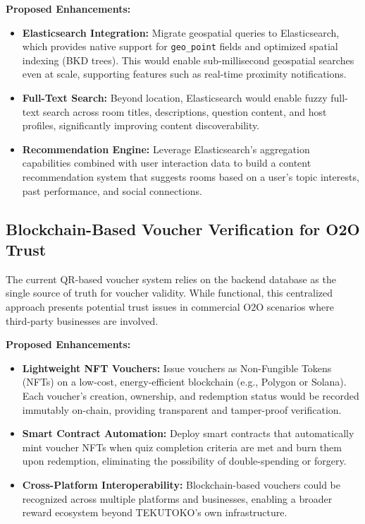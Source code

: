 \textbf{Proposed Enhancements:}
\begin{itemize}
    \item \textbf{Elasticsearch Integration:} Migrate geospatial queries to Elasticsearch, which provides native support for \texttt{geo\_point} fields and optimized spatial indexing (BKD trees). This would enable sub-millisecond geospatial searches even at scale, supporting features such as real-time proximity notifications.
    
    \item \textbf{Full-Text Search:} Beyond location, Elasticsearch would enable fuzzy full-text search across room titles, descriptions, question content, and host profiles, significantly improving content discoverability.
    
    \item \textbf{Recommendation Engine:} Leverage Elasticsearch's aggregation capabilities combined with user interaction data to build a content recommendation system that suggests rooms based on a user's topic interests, past performance, and social connections.
\end{itemize}

\subsection{Blockchain-Based Voucher Verification for O2O Trust}

The current QR-based voucher system relies on the backend database as the single source of truth for voucher validity. While functional, this centralized approach presents potential trust issues in commercial O2O scenarios where third-party businesses are involved.

\textbf{Proposed Enhancements:}
\begin{itemize}
    \item \textbf{Lightweight NFT Vouchers:} Issue vouchers as Non-Fungible Tokens (NFTs) on a low-cost, energy-efficient blockchain (e.g., Polygon or Solana). Each voucher's creation, ownership, and redemption status would be recorded immutably on-chain, providing transparent and tamper-proof verification.
    
    \item \textbf{Smart Contract Automation:} Deploy smart contracts that automatically mint voucher NFTs when quiz completion criteria are met and burn them upon redemption, eliminating the possibility of double-spending or forgery.
    
    \item \textbf{Cross-Platform Interoperability:} Blockchain-based vouchers could be recognized across multiple platforms and businesses, enabling a broader reward ecosystem beyond TEKUTOKO's own infrastructure.
\end{itemize}

